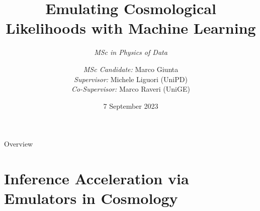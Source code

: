 \documentclass[aspectratio=43,xcolor=svgnames]{beamer} %
\title[shorttitle]{Emulating Cosmological Likelihoods with Machine Learning}
\subtitle{\textit{MSc in Physics of Data}} %
\author{\emph{MSc Candidate:} Marco Giunta\\
        \emph{Supervisor:} Michele Liguori (UniPD)\\
        \emph{Co-Supervisor:} Marco Raveri (UniGE)
        }
{
}
\date{7 September 2023}
\newcommand{\highlightred}[1]{%
  \colorbox{red!50}{$\displaystyle#1$}}
\newcommand{\highlightgreen}[1]{%
  \colorbox{green!50}{$\displaystyle#1$}}
\begin{document}
\begin{frame}
    \titlepage
\end{frame}

\begin{frame}{Overview}
    \small
    \tableofcontents %
\end{frame}




\section{Inference Acceleration via Emulators in Cosmology}

\end{document}
